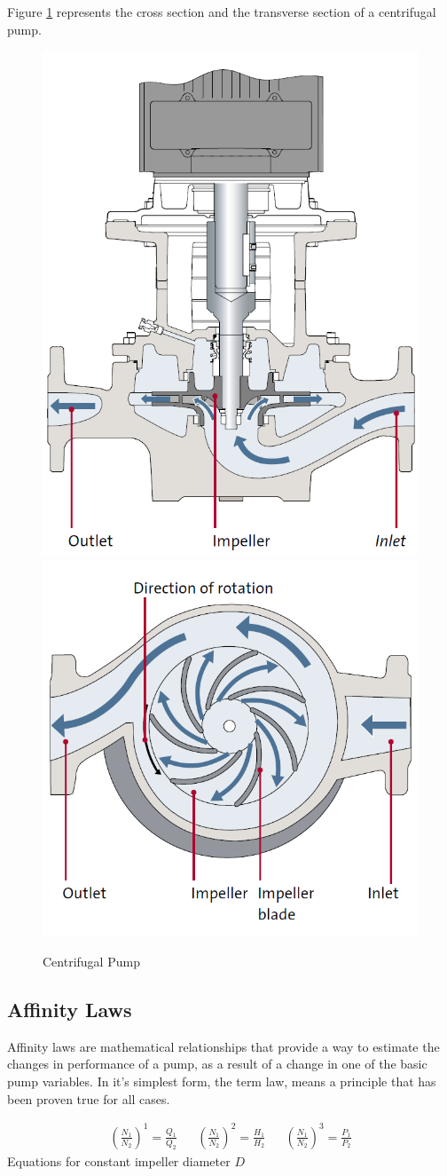 \newpage
Figure \ref{fig:pump_sections} represents the cross section and the transverse section of a centrifugal pump.
\begin{figure}[h]
    \centering
    \includegraphics[width=0.4\linewidth]{figures/pump_cross_section.PNG}
    \qquad
    \hfill
    \includegraphics[width=0.4\linewidth]{figures/pump_above_view.PNG}
    \caption{Centrifugal Pump}
    \label{fig:pump_sections}
\end{figure}

\subsection{Affinity Laws}
Affinity laws are mathematical relationships that provide a way to estimate the changes in performance of a pump, as a result
of a change in one of the basic pump variables.
In it's simplest form, the term law, means a principle that has been proven true for all cases.

\begin{align}
	\left(\frac{N_1}{N_2}\right)^1 = \frac{Q_1}{Q_2} &&
	\left(\frac{N_1}{N_2}\right)^2 = \frac{H_1}{H_2} &&
	\left(\frac{N_1}{N_2}\right)^3 = \frac{P_1}{P_2}	
\end{align} 
Equations for constant impeller diameter $D$ \cite{AffinityLaws}


